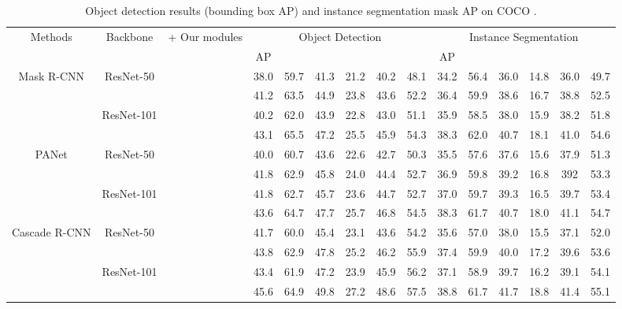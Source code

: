 \documentclass[journal]{IEEEtran}
\def\qcr{\fontfamily{qcr}\selectfont}
\begin{document}
	
	\begin{table*}[t]
		\centering
		\footnotesize
		\caption{Object detection 
results (bounding box AP) and instance segmentation mask AP on COCO {\qcr{test-dev}}.}
{
			\begin{tabular}{c|c|c|cccccc|cccccc}
				\toprule
				\multirow{2}{*}{Methods} & \multirow{2}{*}{Backbone} & \multicolumn{1}{c|}{\multirow{2}{*}{ + Our modules}} & \multicolumn{6}{c|}{Object Detection}                & \multicolumn{6}{c}{Instance Segmentation} \\
				\cline{4-15}   &       &       & AP    &  &  &  &  &  & AP   &  &  &  &  &  \\
				\hline
				\multirow{4}{*}{Mask R-CNN} & \multirow{2}[2]{*}{ResNet-50} &       &  38.0  & 59.7 & 41.3 & 21.2  & 40.2  & 48.1  & 34.2  & 56.4 & 36.0  &   14.8 & 36.0 & 49.7 \\
				&       &      & 41.2 & 63.5  & 44.9 & 23.8 & 43.6 & 52.2 & 36.4 & 59.9 & 38.6 &  16.7 & 38.8 &  52.5\\
				\cline{2-15}          & \multirow{2}[2]{*}{ResNet-101} &       & 40.2 & 62.0 & 43.9 & 22.8   & 43.0 & 51.1  &35.9 & 58.5 & 38.0 & 15.9 & 38.2 & 51.8 \\
				&       &       & 43.1 & 65.5 & 47.2 & 25.5  & 45.9 & 54.3 & 38.3 & 62.0 & 40.7 & 18.1 & 41.0 & 54.6 \\
				\hline
				\multirow{4}{*}{PANet} & \multirow{2}[2]{*}{ResNet-50} &       & 40.0 & 60.7 &  43.6 & 22.6 & 42.7 & 50.3 & 35.5 & 57.6 & 37.6 & 15.6  & 37.9 & 51.3 \\
				&   &       & 41.8 & 62.9 & 45.8 & 24.0  & 44.4 & 52.7 & 36.9 & 59.8 & 39.2 &  16.8 & 392 & 53.3 \\
				\cline{2-15}          & \multirow{2}[2]{*}{ResNet-101} &       & 41.8  & 62.7 & 45.7 & 23.6 & 44.7 & 52.7 & 37.0 & 59.7 & 39.3 & 16.5 & 39.7  & 53.4\\
				&       &  & 43.6 & 64.7 & 47.7 & 25.7 & 46.8 & 54.5 & 38.3 & 61.7 & 40.7 & 18.0 & 41.1 & 54.7\\
				\hline
				\multirow{4}{*}{Cascade R-CNN} & \multirow{2}[2]{*}{ResNet-50} &       &  41.7  & 60.0 & 45.4 &  23.1 &  43.6 & 54.2 & 35.6 & 57.0 & 38.0 & 15.5 & 37.1 & 52.0 \\
				&       &       & 43.8 & 62.9 & 47.8 & 25.2 & 46.2 & 55.9 & 37.4 & 59.9 & 40.0 &  17.2  & 39.6 &  53.6\\
				\cline{2-15}          & \multirow{2}[2]{*}{ResNet-101} &       & 43.4  & 61.9 & 47.2 &  23.9 & 45.9 & 56.2 & 37.1 & 58.9 & 39.7 & 16.2 & 39.1 & 54.1 \\
				&       &       & 45.6 & 64.9 & 49.8 & 27.2 & 48.6 & 57.5 & 38.8 & 61.7 & 41.7 & 18.8 & 41.4 & 55.1 \\
				\bottomrule
		\end{tabular}}
\label{tab:instance_segmentation_test_dev}\end{table*}
\end{document}
